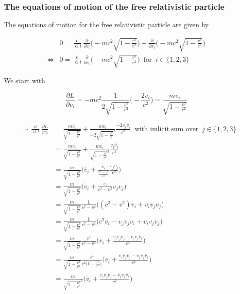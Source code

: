 \documentclass{article}
\DeclareMathOperator{\dd}{d\!}
\begin{document}
\subsubsection{The equations of motion of the free relativistic particle} \label{sectionEquOfMotionFreeParticle}

The equations of motion for the free relativistic particle are given by

\begin{align}
    &0 = \frac{\dd}{\dd t} \frac{\partial }{\partial v_i} \bigg(-mc^2 \sqrt{1-\frac{v^2}{c^2}}\bigg) - \frac{\partial }{\partial x_i} \bigg(-mc^2 \sqrt{1-\frac{v^2}{c^2}}\bigg)
    \nonumber \\
    \iff &0 = \frac{\dd}{\dd t} \frac{\partial }{\partial v_i} \bigg(-mc^2 \sqrt{1-\frac{v^2}{c^2}}\bigg) \;\; \text{for} \;\; i \in \{1,2,3\}
\end{align}

We start with

\begin{equation}
    \frac{\partial L}{\partial v_i} = - m c^2 \frac{1}{2 \sqrt{1 - \frac{v^2}{c^2}}} \bigg(- \frac{2 v_i}{c^2}\bigg) = \frac{m v_i}{\sqrt{1 - \frac{v^2}{c^2}}}
\end{equation}


\begin{align}
   \implies \frac{\dd}{\dd t} \frac{\partial L}{\partial v_i}
   &= \frac{m \dot{v_i}}{\sqrt{1 - \frac{v^2}{c^2}}} + \frac{m v_i}{-2 \sqrt{1 - \frac{v^2}{c^2}}^3} \frac{-2 v_j \dot{v_j}}{c^2} \;\; \text{with imlicit sum over} \;\; j \in \{1,2,3\} \nonumber \\
   &= \frac{m \dot{v_i}}{\sqrt{1 - \frac{v^2}{c^2}}} + \frac{m v_i}{\sqrt{1 - \frac{v^2}{c^2}}^3} \frac{v_j \dot{v_j}}{c^2} \nonumber \\
   &= \frac{m}{\sqrt{1 - \frac{v^2}{c^2}}} \bigg( \dot{v_i} + \frac{v_i}{\frac{c^2 - v^2}{c^2}} \frac{v_j \dot{v_j}}{c^2} \bigg)\nonumber \\
   &= \frac{m}{\sqrt{1 - \frac{v^2}{c^2}}} \bigg( \dot{v_i} + \frac{v_i}{c^2 - v^2} v_j \dot{v_j} \bigg)\nonumber \\
   &= \frac{m}{\sqrt{1 - \frac{v^2}{c^2}}} \frac{1}{c^2 -v^2} \bigg( (c^2 -v^2) \dot{v_i} + v_i v_j \dot{v_j} \bigg)\nonumber \\
   &= \frac{m}{\sqrt{1 - \frac{v^2}{c^2}}} \frac{1}{c^2 -v^2} \bigg( c^2 \dot{v_i} - v_j v_j \dot{v_i} + v_i v_j \dot{v_j} \bigg)\nonumber \\
   &= \frac{m}{\sqrt{1 - \frac{v^2}{c^2}}} \frac{c^2}{c^2 -v^2} \bigg( \dot{v_i} + \frac{v_i v_j \dot{v_j} - v_j v_j \dot{v_i}}{c^2} \bigg)\nonumber \\
   &= \frac{m}{\sqrt{1 - \frac{v^2}{c^2}}} \frac{c^2}{c^2\big(1- \frac{v^2}{c^2}\big)} \bigg( \dot{v_i} + \frac{v_i v_j \dot{v_j} - v_j v_j \dot{v_i}}{c^2} \bigg)\nonumber \\
   &= \frac{m}{\sqrt{1 - \frac{v^2}{c^2}}^3} \bigg( \dot{v_i} + \frac{v_i v_j \dot{v_j} - v_j v_j \dot{v_i}}{c^2} \bigg) \label{relativisticFreeEquationOfMotion}
\end{align}
\end{document}
